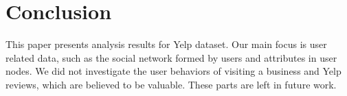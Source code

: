 \documentclass[11pt, oneside]{article}   	%
\begin{document}
\section{Conclusion}
This paper presents analysis results for Yelp dataset. Our main focus is user related data, such as the social network 
formed by users and attributes in user nodes.  We did not investigate the user behaviors of visiting a business and Yelp 
reviews, which are believed to be valuable.  These parts are left in future work. 


 
\end{document}
